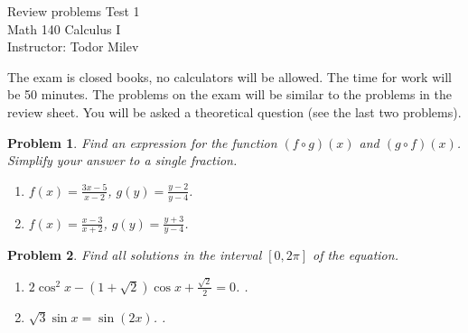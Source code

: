 \documentclass{article}
\newtheorem{problem}{Problem}
\begin{document}
\begin{center}
\Large
Review problems Test 1\\ Math 140 Calculus I \\ \normalsize Instructor: Todor Milev
\end{center}


\noindent The exam is closed books, no calculators will be allowed. The time for work will be 50 minutes. The problems on the exam will be similar to the problems in the review sheet. You will be asked a theoretical question (see the last two problems).
\begin{problem}
Find an expression for the function $(f\circ g)(x)$ and $(g\circ f)(x)$. Simplify your answer to a single fraction. 
\begin{enumerate}
\item $ f(x)= \frac{3x-5}{x-2}$, $g(y)=\frac{y-2 }{y-4} $. 
\item $ f(x)= \frac{x-3}{x+2}$, $g(y)=\frac{y+3 }{y-4} $. 
\end{enumerate}
\end{problem}
\begin{problem}
Find all solutions in the interval $[0,2\pi]$ of the equation.
\begin{enumerate}
\item $2\cos^{2}x-(1+\sqrt{2})\cos x+\frac{\sqrt{2}}{2}=0$. .
\item $\sqrt {3} \sin x= \sin (2x)$.  .
\end{enumerate}
\end{problem}
\end{document}
